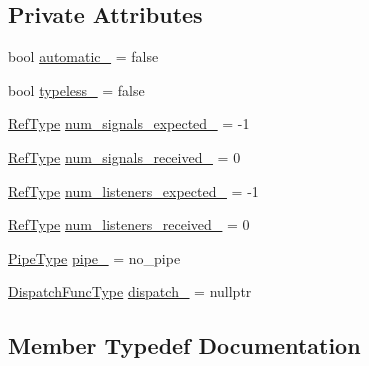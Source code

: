 \subsection*{Private Attributes}
\begin{DoxyCompactItemize}
\item 
bool \hyperlink{structvt_1_1pipe_1_1_pipe_state_afc74c762209659919822abb37dda8b89}{automatic\+\_\+} = false
\item 
bool \hyperlink{structvt_1_1pipe_1_1_pipe_state_af73f5f3e239e4db909b1cde2aa7de3f3}{typeless\+\_\+} = false
\item 
\hyperlink{namespacevt_a9b39ce9494bb04674d0d5b895a5aa50f}{Ref\+Type} \hyperlink{structvt_1_1pipe_1_1_pipe_state_a6e646d7d9caad625d42c54dd0260f925}{num\+\_\+signals\+\_\+expected\+\_\+} = -\/1
\item 
\hyperlink{namespacevt_a9b39ce9494bb04674d0d5b895a5aa50f}{Ref\+Type} \hyperlink{structvt_1_1pipe_1_1_pipe_state_aa5d938c0edcb612328a083878924e593}{num\+\_\+signals\+\_\+received\+\_\+} = 0
\item 
\hyperlink{namespacevt_a9b39ce9494bb04674d0d5b895a5aa50f}{Ref\+Type} \hyperlink{structvt_1_1pipe_1_1_pipe_state_a9aa2e2c9dd20a8b6e941aad7ca3a8d40}{num\+\_\+listeners\+\_\+expected\+\_\+} = -\/1
\item 
\hyperlink{namespacevt_a9b39ce9494bb04674d0d5b895a5aa50f}{Ref\+Type} \hyperlink{structvt_1_1pipe_1_1_pipe_state_a6692c3d9b4d00278d3ff1bc545853fcc}{num\+\_\+listeners\+\_\+received\+\_\+} = 0
\item 
\hyperlink{namespacevt_ac9852acda74d1896f48f406cd72c7bd3}{Pipe\+Type} \hyperlink{structvt_1_1pipe_1_1_pipe_state_a7444cbbce857d44145abb9e44eda23ea}{pipe\+\_\+} = no\+\_\+pipe
\item 
\hyperlink{structvt_1_1pipe_1_1_pipe_state_ad81b637847d9c3185420c58c9272ed7d}{Dispatch\+Func\+Type} \hyperlink{structvt_1_1pipe_1_1_pipe_state_aca06c747d1462b15cf61431ea7d35330}{dispatch\+\_\+} = nullptr
\end{DoxyCompactItemize}


\subsection{Member Typedef Documentation}
\mbox{\label{structvt_1_1pipe_1_1_pipe_state_ad81b637847d9c3185420c58c9272ed7d}} 
